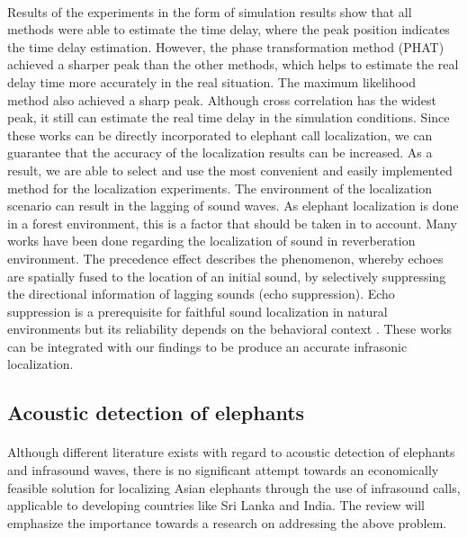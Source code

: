 \documentclass[12pt]{article}
\numberwithin{figure}{section}
\numberwithin{table}{section}
\begin{document}
\paragraph{}
Results of the experiments in the form of simulation results \cite {26} show that all methods were able to estimate the time delay, where the peak position indicates the time delay estimation. However, the phase transformation method (PHAT) achieved a sharper peak than the other methods, which helps to estimate the real delay time more accurately in the real situation. The maximum likelihood method also achieved a sharp peak. Although cross correlation has the widest peak, it still can estimate the real time delay in the simulation conditions. Since these works can be directly incorporated to elephant call localization, we can guarantee that the accuracy of the localization results can be increased. As a result, we are able to select and use the most convenient and easily implemented method for the localization experiments. The environment of the localization scenario can result in the lagging of sound waves. As elephant localization is done in a forest environment, this is a factor that should be taken in to account. Many works have been done regarding the localization of sound in reverberation environment. The precedence effect describes the phenomenon, whereby echoes are spatially fused to the location of an initial sound, by selectively suppressing the directional information of lagging sounds (echo suppression). Echo suppression is a prerequisite for faithful sound localization in natural environments but its reliability depends on the behavioral context \cite {27}. These works can be integrated with our findings to be produce an accurate infrasonic localization. 

\subsection{Acoustic detection of elephants}
\paragraph{}
Although different literature exists with regard to acoustic detection of elephants and infrasound waves, there is no significant attempt towards an economically feasible solution for localizing Asian elephants through the use of infrasound calls, applicable to developing countries like Sri Lanka and India. The review will emphasize the importance towards a research on addressing the above problem.
\end{document}
